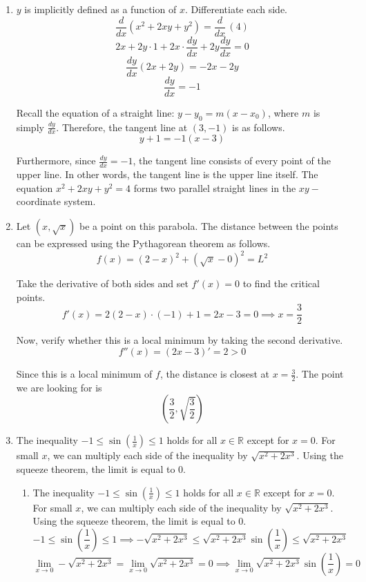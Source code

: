 \documentclass[a4paper, 12pt]{article}
\begin{document}

\begin{enumerate}[leftmargin=*,label=\textbf{\arabic*.}]

\item $y$ is implicitly defined as a function of $x$. Differentiate each side.
\[\frac{d}{dx}\left(x^2+2xy+y^2\right)=\frac{d}{dx}\,(4)\]
\[2x+2y\cdot1+2x\cdot\frac{dy}{dx}+2y\frac{dy}{dx}=0\]
\[\frac{dy}{dx}(2x+2y)=-2x-2y\]
\[\frac{dy}{dx}=-1\]

Recall the equation of a straight line: $y-y_0=m(x-x_0)$, where $m$ is simply $\displaystyle \frac{dy}{dx}$. Therefore, the tangent line at $(3,-1)$ is as follows.
\[\boxed{y+1=-1(x-3)}\]

Furthermore, since $\displaystyle \frac{dy}{dx}=-1$, the tangent line consists of every point of the upper line. In other words, the tangent line is the upper line itself. The equation $x^2+2xy+y^2=4$ forms two parallel straight lines in the $xy-$coordinate system.

\vspace{1em}

\item Let $\left(x,\sqrt x\right)$ be a point on this parabola. The distance between the points can be expressed using the Pythagorean theorem as follows.
\[f(x)=(2-x)^2 + \left(\sqrt x - 0\right)^2=L^2\]

Take the derivative of both sides and set $\displaystyle f'(x)=0$ to find the critical points.
\begin{equation*}
f'(x)=2(2-x)\cdot(-1) + 1 = 2x-3=0 \implies x=\frac{3}2
\end{equation*}

Now, verify whether this is a local minimum by taking the second derivative.
\[f''(x)=(2x-3)'=2>0\]

Since this is a local minimum of $f$, the distance is closest at $\displaystyle x=\frac32$. The point we are looking for is
\[\boxed{\left(\frac32,\sqrt{\frac32}\right)}\]

\newpage

\item The inequality $\displaystyle-1 \leq \sin\left(\frac1x\right)\leq1$ holds for all $x\in\mathbb{R}$ except for $x=0$. For small $x$, we can multiply each side of the inequality by $\sqrt{x^2+2x^3}$. Using the squeeze theorem, the limit is equal to $0$.

\begin{enumerate}[leftmargin=*,label=\textbf{\alph*.}]
\item The inequality $\displaystyle-1 \leq \sin\left(\frac1x\right)\leq1$ holds for all $x\in\mathbb{R}$ except for $x=0$. For small $x$, we can multiply each side of the inequality by $\sqrt{x^2+2x^3}$. Using the squeeze theorem, the limit is equal to $0$.
\[-1\leq\sin\left(\frac1x\right)\leq1\implies -\sqrt{x^2+2x^3}\leq\sqrt{x^2+2x^3}\sin\left(\frac1x\right)\leq\sqrt{x^2+2x^3}\]
\[\lim_{x\to0}-\sqrt{x^2+2x^3}=\lim_{x\to0}\sqrt{x^2+2x^3}=0\implies\lim_{x\to0}\sqrt{x^2+2x^3}\sin\left(\frac1x\right)=\boxed0\]


\end{enumerate}
\end{enumerate}
\end{document}
